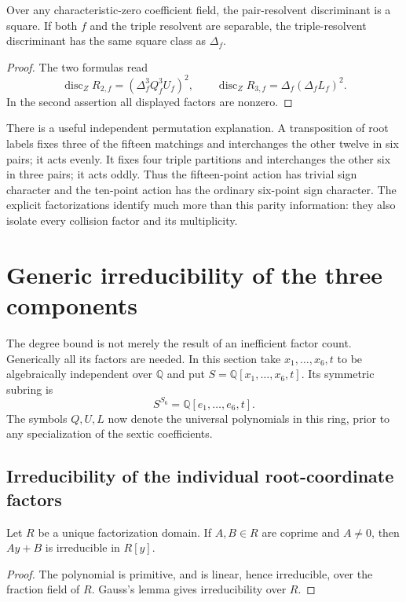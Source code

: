 \documentclass[11pt,letterpaper]{article}
\numberwithin{equation}{section}
\theoremstyle{definition}
\theoremstyle{remark}
\DeclareMathOperator{\disc}{disc}
\newcommand{\QQ}{\mathbb Q}
\newcommand{\Rtwo}{R_{2,f}}
\newcommand{\Rthree}{R_{3,f}}
\begin{document}
\begin{corollary}
\label{sbr:cor:squareclass}
Over any characteristic-zero coefficient field, the pair-resolvent
discriminant is a square. If both $f$ and the triple resolvent are
separable, the triple-resolvent discriminant has the same square class
as $\Delta_f$.
\end{corollary}
\begin{proof}
The two formulas read
\[
 \disc_Z\Rtwo=(\Delta_f^3Q_f^3U_f)^2,
 \qquad
 \disc_Z\Rthree=\Delta_f(\Delta_f L_f)^2.
\]
In the second assertion all displayed factors are nonzero.
\end{proof}

There is a useful independent permutation explanation. A transposition of
root labels fixes three of the fifteen matchings and interchanges the
other twelve in six pairs; it acts evenly. It fixes four triple partitions
and interchanges the other six in three pairs; it acts oddly. Thus the
fifteen-point action has trivial sign character and the ten-point action
has the ordinary six-point sign character. The explicit factorizations
identify much more than this parity information: they also isolate every
collision factor and its multiplicity.

\section{Generic irreducibility of the three components}
\label{sbr:sec:irreducibility}

The degree bound is not merely the result of an inefficient factor count.
Generically all its factors are needed. In this section take
$x_1,\ldots,x_6,t$ to be algebraically independent over $\QQ$ and put
$S=\QQ[x_1,\ldots,x_6,t]$. Its symmetric subring is
\[
 S^{S_6}=\QQ[e_1,\ldots,e_6,t].
\]
The symbols $Q,U,L$ now denote the universal polynomials in this ring,
prior to any specialization of the sextic coefficients.

\subsection{Irreducibility of the individual root-coordinate factors}

\begin{lemma}
\label{sbr:lem:primitive}
Let $R$ be a unique factorization domain. If $A,B\in R$ are coprime and
$A\ne0$, then $Ay+B$ is irreducible in $R[y]$.
\end{lemma}
\begin{proof}
The polynomial is primitive, and is linear, hence irreducible, over the
fraction field of $R$. Gauss's lemma gives irreducibility over $R$.
\end{proof}
\end{document}
